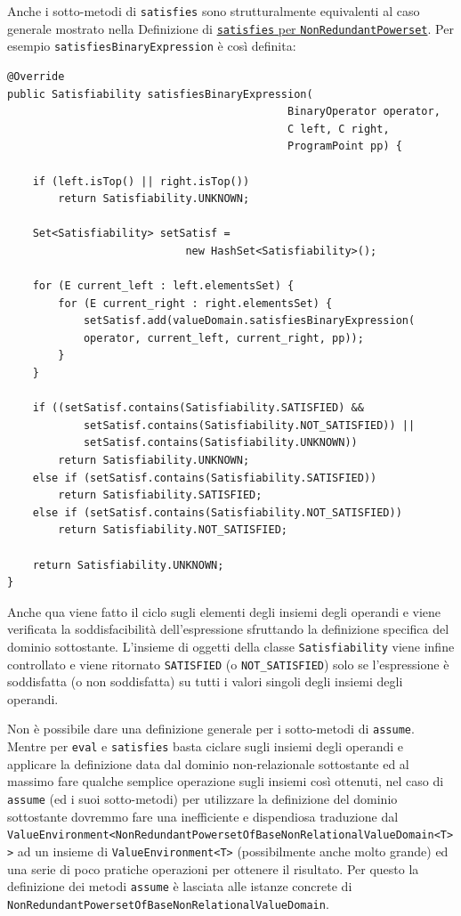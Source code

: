 Anche i sotto-metodi di \texttt{satisfies} sono strutturalmente equivalenti al caso generale mostrato nella Definizione di \hyperref[code:satisfiesPowersetGeneral]{\texttt{satisfies} per \texttt{NonRedundantPowerset}}. Per esempio \texttt{satisfiesBinaryExpression} è così definita:  
\begin{lstlisting}[belowskip=-1.1 \baselineskip]
@Override
public Satisfiability satisfiesBinaryExpression(
                                            BinaryOperator operator, 
                                            C left, C right, 
                                            ProgramPoint pp) {

    if (left.isTop() || right.isTop())
        return Satisfiability.UNKNOWN;

    Set<Satisfiability> setSatisf = 
                            new HashSet<Satisfiability>();
                            
    for (E current_left : left.elementsSet) {
        for (E current_right : right.elementsSet) {
            setSatisf.add(valueDomain.satisfiesBinaryExpression(
            operator, current_left, current_right, pp));
        }
    }
    
    if ((setSatisf.contains(Satisfiability.SATISFIED) && 
            setSatisf.contains(Satisfiability.NOT_SATISFIED)) ||
            setSatisf.contains(Satisfiability.UNKNOWN))
        return Satisfiability.UNKNOWN;
    else if (setSatisf.contains(Satisfiability.SATISFIED))
        return Satisfiability.SATISFIED;
    else if (setSatisf.contains(Satisfiability.NOT_SATISFIED))
        return Satisfiability.NOT_SATISFIED;

    return Satisfiability.UNKNOWN;
}
\end{lstlisting}
Anche qua viene fatto il ciclo sugli elementi degli insiemi degli operandi e viene verificata la soddisfacibilità dell'espressione sfruttando la definizione specifica del dominio sottostante. L'insieme di oggetti della classe \texttt{Satisfiability} viene infine controllato e viene ritornato \texttt{SATISFIED} (o \texttt{NOT\_SATISFIED}) solo se l'espressione è soddisfatta (o non soddisfatta) su tutti i valori singoli degli insiemi degli operandi. 

Non è possibile dare una definizione generale per i sotto-metodi di \texttt{assume}. Mentre per \texttt{eval} e \texttt{satisfies} basta ciclare sugli insiemi degli operandi e applicare la definizione data dal dominio non-relazionale sottostante ed al massimo fare qualche semplice operazione sugli insiemi così ottenuti, nel caso di \texttt{assume} (ed i suoi sotto-metodi) per utilizzare la definizione del dominio sottostante dovremmo fare una inefficiente e dispendiosa traduzione dal \texttt{ValueEnvironment<NonRedundantPowersetOfBaseNonRelationalValueDomain<T>>} ad un insieme di \texttt{ValueEnvironment<T>} (possibilmente anche molto grande) ed una serie di poco pratiche operazioni per ottenere il risultato. Per questo la definizione dei metodi \texttt{assume} è lasciata alle istanze concrete di \texttt{NonRedundantPowersetOfBaseNonRelationalValueDomain}.

